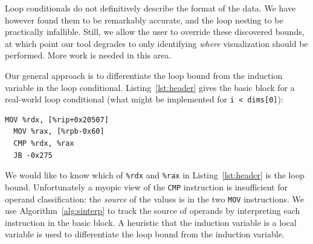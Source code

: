 Loop conditionals do not definitively describe the format of the data.
We have however found them to be remarkably accurate, and the loop
nesting to be practically infallible.  Still, we allow the user to
override these discovered bounds, at which point our tool degrades to
only identifying \emph{where} visualization should be performed.  More
work is needed in this area.

Our general approach is to differentiate the loop bound from the
induction variable in the loop conditional.
Listing~\ref{lst:header} gives the basic block for a real-world loop
conditional (what might be implemented for \texttt{i < dims[0]}):

\begin{lstlisting}[label=lst:header,caption=Instructions within a
sample loop header.  The induction variable and the loop bound
appear as arguments to the \texttt{CMP} instruction.]
  MOV %rdx, [%rip+0x20507]
  MOV %rax, [%rpb-0x60]
  CMP %rdx, %rax
  JB -0x275
\end{lstlisting}

We would like to know which of \texttt{\%rdx} and \texttt{\%rax} in
Listing~\ref{lst:header} is the loop bound.  Unfortunately a myopic
view of
the \texttt{CMP} instruction is insufficient for operand
classification: the \emph{source} of the values is
in the two \texttt{MOV} instructions.
We use Algorithm~\ref{alg:sinterp} to track the source of operands by
interpreting each instruction in the basic block.  A heuristic that the
induction variable is a local variable is used to differentiate the
loop bound from the induction variable.

